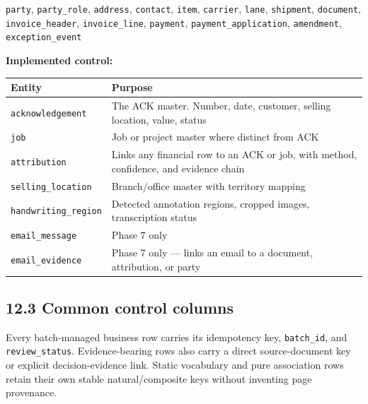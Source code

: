 \documentclass[
]{article}
\newcounter{none} %
\begin{document}
\texttt{party}, \texttt{party\_\allowbreak{}role}, \texttt{address},
\texttt{contact}, \texttt{item}, \texttt{carrier}, \texttt{lane},
\texttt{shipment}, \texttt{document},
\texttt{invoice\_\allowbreak{}header},
\texttt{invoice\_\allowbreak{}line}, \texttt{payment},
\texttt{payment\_\allowbreak{}application}, \texttt{amendment},
\texttt{exception\_\allowbreak{}event}

\textbf{Implemented control:}

{\def\LTcaptype{none} %
\begin{longtable}[]{@{}
  >{\raggedright\arraybackslash}p{}
  >{\raggedright\arraybackslash}p{}@{}}
\toprule\noalign{}
\begin{minipage}[b]{\linewidth}\raggedright
Entity
\end{minipage} & \begin{minipage}[b]{\linewidth}\raggedright
Purpose
\end{minipage} \\
\midrule\noalign{}
\endhead
\bottomrule\noalign{}
\endlastfoot
\texttt{acknowledgement} & The ACK master. Number, date, customer,
selling location, value, status \\
\texttt{job} & Job or project master where distinct from ACK \\
\texttt{attribution} & Links any financial row to an ACK or job, with
method, confidence, and evidence chain \\
\texttt{selling\_\allowbreak{}location} & Branch/office master with
territory mapping \\
\texttt{handwriting\_\allowbreak{}region} & Detected annotation regions,
cropped images, transcription status \\
\texttt{email\_\allowbreak{}message} & Phase 7 only \\
\texttt{email\_\allowbreak{}evidence} & Phase 7 only --- links an email
to a document, attribution, or party \\
\end{longtable}
}

\subsection{12.3 Common control columns}\label{common-control-columns}

Every batch-managed business row carries its idempotency key,
\texttt{batch\_\allowbreak{}id}, and
\texttt{review\_\allowbreak{}status}. Evidence-bearing rows also carry a
direct source-document key or explicit decision-evidence link. Static
vocabulary and pure association rows retain their own stable
natural/composite keys without inventing page provenance.
\end{document}

